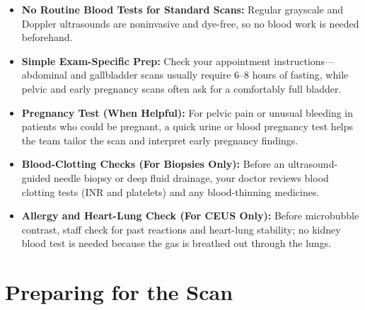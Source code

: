 \begin{itemize}
    \item \textbf{No Routine Blood Tests for Standard Scans:} Regular grayscale and Doppler ultrasounds are noninvasive and dye-free, so no blood work is needed beforehand.
    \item \textbf{Simple Exam-Specific Prep:} Check your appointment instructions---abdominal and gallbladder scans usually require 6--8 hours of fasting, while pelvic and early pregnancy scans often ask for a comfortably full bladder.
    \item \textbf{Pregnancy Test (When Helpful):} For pelvic pain or unusual bleeding in patients who could be pregnant, a quick urine or blood pregnancy test helps the team tailor the scan and interpret early pregnancy findings.
    \item \textbf{Blood-Clotting Checks (For Biopsies Only):} Before an ultrasound-guided needle biopsy or deep fluid drainage, your doctor reviews blood clotting tests (INR and platelets) and any blood-thinning medicines.
    \item \textbf{Allergy and Heart-Lung Check (For CEUS Only):} Before microbubble contrast, staff check for past reactions and heart-lung stability; no kidney blood test is needed because the gas is breathed out through the lungs.
\end{itemize}

\section{Preparing for the Scan}

